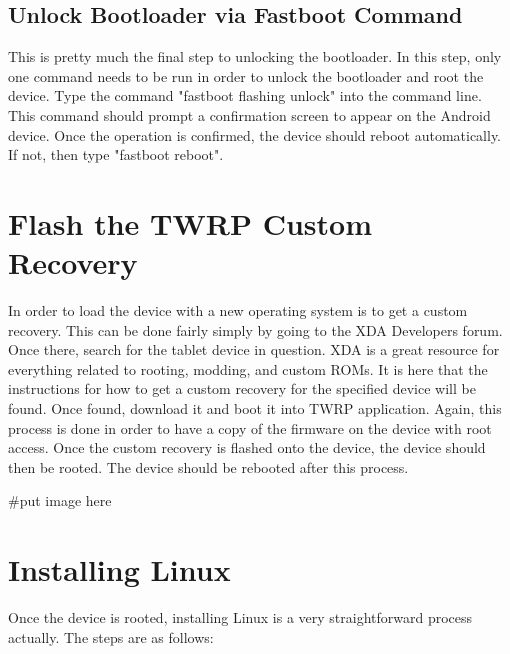 \subsection{Unlock Bootloader via Fastboot Command}
This is pretty much the final step to unlocking the bootloader. In this step, only one command needs to be run in order to unlock the bootloader and root the device. 
Type the command "fastboot flashing unlock" into the command line. This command should prompt a confirmation screen to appear on the Android device. 
Once the operation is confirmed, the device should reboot automatically. If not, then type "fastboot reboot".

\section{Flash the TWRP Custom Recovery}
In order to load the device with a new operating system is to get a custom recovery. This can be done fairly simply by going to the XDA Developers forum. 
Once there, search for the tablet device in question. XDA is a great resource for everything related to rooting, modding, and custom ROMs. It is here that 
the instructions for how to get a custom recovery for the specified device will be found. Once found, download it and boot it into TWRP application. Again, 
this process is done in order to have a copy of the firmware on the device with root access. Once the custom recovery is flashed onto the device, the device should 
then be rooted. The device should be rebooted after this process.

#put image here

\section{Installing Linux}
Once the device is rooted, installing Linux is a very straightforward process actually. The steps are as follows:

